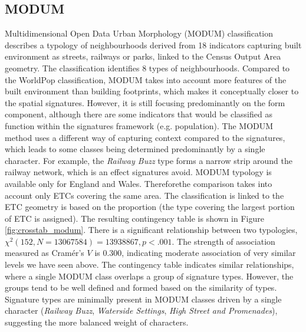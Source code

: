 \documentclass[fleqn,10pt]{wlscirep}
\providecommand{\DIFadd}[1]{{\protect\color{blue}\uwave{#1}}} %
\providecommand{\DIFaddbegin}{} %
\providecommand{\DIFaddend}{} %
\begin{document}
\subsection*{MODUM}
Multidimensional Open Data Urban Morphology (MODUM) classification describes a typology
of neighbourhoods derived from 18 indicators capturing built environment as streets,
railways or parks, linked to the Census Output Area geometry. The classification
identifies 8 types of neighbourhoods.
Compared to the WorldPop classification, MODUM takes into account more features of
the built environment than building footprints, which makes it conceptually closer to the
spatial signatures. However, it is still focusing predominantly on the form component,
although there are some indicators that would be classified as function within the
signatures framework (e.g. population). The MODUM method uses a different way of
capturing context compared to the signatures, which leads to some classes being
determined predominantly by a single character. For example, the \textit{Railway Buzz} type
forms a narrow strip around the railway network, which is an effect signatures avoid.
MODUM typology is available only for England and Wales. Therefore\DIFaddbegin \DIFadd{, }\DIFaddend the comparison takes
into account only ETCs covering the same area. The classification is linked to the
ETC geometry is based on the proportion (the type covering the largest portion of ETC is
assigned). The resulting contingency table is shown in Figure \ref{fig:crosstab_modum}. There is a
significant relationship between two typologies, $\chi^{2} (152, N = 13067584) =
13938867, p < .001$. The strength of association measured as Cramér's $V$ is $0.300$,
indicating moderate association of very similar levels we have seen above. The
contingency table indicates similar relationships, where a single MODUM class overlaps a
group of signature types. However, the groups tend to be well defined and formed based
on the similarity of types. Signature types are minimally present in MODUM classes driven
by a single character (\textit{Railway Buzz}, \textit{Waterside Settings},
\textit{High Street and Promenades}), suggesting the more balanced weight of characters.
\end{document}
